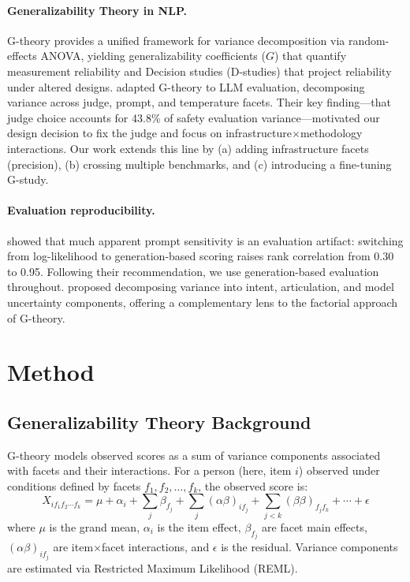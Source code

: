 \documentclass[letterpaper]{article}
\begin{document}
\paragraph{Generalizability Theory in NLP.}
G-theory \citep{brennan2001generalizability} provides a unified framework for variance decomposition via random-effects ANOVA, yielding generalizability coefficients ($G$) that quantify measurement reliability and Decision studies (D-studies) that project reliability under altered designs.
\citet{mesting2026} adapted G-theory to LLM evaluation, decomposing variance across judge, prompt, and temperature facets.
Their key finding---that judge choice accounts for 43.8\% of safety evaluation variance---motivated our design decision to fix the judge and focus on infrastructure$\times$methodology interactions.
Our work extends this line by (a) adding infrastructure facets (precision), (b) crossing multiple benchmarks, and (c) introducing a fine-tuning G-study.

\paragraph{Evaluation reproducibility.}
\citet{hua2025emnlp} showed that much apparent prompt sensitivity is an evaluation artifact: switching from log-likelihood to generation-based scoring raises rank correlation from 0.30 to 0.95.
Following their recommendation, we use generation-based evaluation throughout.
\citet{kunievsky2025} proposed decomposing variance into intent, articulation, and model uncertainty components, offering a complementary lens to the factorial approach of G-theory.


\section{Method}

\subsection{Generalizability Theory Background}

G-theory models observed scores as a sum of variance components associated with facets and their interactions.
For a person (here, item $i$) observed under conditions defined by facets $f_1, f_2, \ldots, f_k$, the observed score is:
\begin{equation}
    X_{if_1 f_2 \cdots f_k} = \mu + \alpha_i + \sum_j \beta_{f_j} + \sum_{j} (\alpha\beta)_{if_j} + \sum_{j<k} (\beta\beta)_{f_j f_k} + \cdots + \epsilon
\end{equation}
where $\mu$ is the grand mean, $\alpha_i$ is the item effect, $\beta_{f_j}$ are facet main effects, $(\alpha\beta)_{if_j}$ are item$\times$facet interactions, and $\epsilon$ is the residual.
Variance components are estimated via Restricted Maximum Likelihood (REML).
\end{document}
